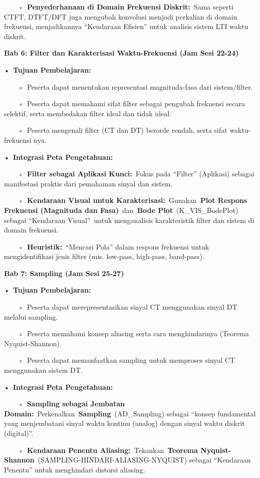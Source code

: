 \documentclass[
  letterpaper,
  DIV=11,
  numbers=noendperiod]{scrreprt}
\begin{document}
~~~~◦~\textbf{Penyederhanaan di Domain Frekuensi Diskrit:}~Sama seperti
CTFT, DTFT/DFT juga mengubah konvolusi menjadi perkalian di domain
frekuensi, menjadikannya ``Kendaraan Efisien'' untuk analisis sistem LTI
waktu diskrit.

\textbf{Bab 6: Filter dan Karakterisasi Waktu-Frekuensi (Jam Sesi
22-24)}

•~\textbf{Tujuan Pembelajaran:}

~~~~◦~Peserta dapat menentukan representasi magnituda-fasa dari
sistem/filter.

~~~~◦~Peserta dapat memahami sifat filter sebagai pengubah frekuensi
secara selektif, serta membedakan filter ideal dan tidak ideal.

~~~~◦~Peserta mengenali filter (CT dan DT) berorde rendah, serta sifat
waktu-frekuensi nya.

•~\textbf{Integrasi Peta Pengetahuan:}

~~~~◦~\textbf{Filter sebagai Aplikasi Kunci:}~Fokus pada ``Filter''
(Aplikasi) sebagai manifestasi praktis dari pemahaman sinyal dan sistem.

~~~~◦~\textbf{Kendaraan Visual untuk
Karakterisasi:}~Gunakan~\textbf{Plot Respons Frekuensi (Magnituda dan
Fasa)}~dan~\textbf{Bode Plot}~(K\_VIS\_BodePlot) sebagai ``Kendaraan
Visual''~untuk menganalisis karakteristik filter dan sistem di domain
frekuensi.

~~~~◦~\textbf{Heuristik:}~``Mencari Pola'' dalam respons frekuensi untuk
mengidentifikasi jenis filter (mis. low-pass, high-pass, band-pass).

\textbf{Bab 7: Sampling (Jam Sesi 25-27)}

•~\textbf{Tujuan Pembelajaran:}

~~~~◦~Peserta dapat merepresentasikan sinyal CT menggunakan sinyal DT
melalui sampling.

~~~~◦~Peserta memahami konsep aliasing serta cara menghindarinya
(Teorema Nyquist-Shannon).

~~~~◦~Peserta dapat memanfaatkan sampling untuk memproses sinyal CT
menggunakan sistem DT.

•~\textbf{Integrasi Peta Pengetahuan:}

~~~~◦~\textbf{Sampling sebagai Jembatan
Domain:}~Perkenalkan~\textbf{Sampling}~(AD\_Sampling) sebagai ``konsep
fundamental yang menjembatani sinyal waktu kontinu (analog) dengan
sinyal waktu diskrit (digital)''.

~~~~◦~\textbf{Kendaraan Penentu Aliasing:}~Tekankan~\textbf{Teorema
Nyquist-Shannon}~(SAMPLING-HINDARI-ALIASING-NYQUIST) sebagai ``Kendaraan
Penentu'' untuk menghindari distorsi aliasing.
\end{document}
